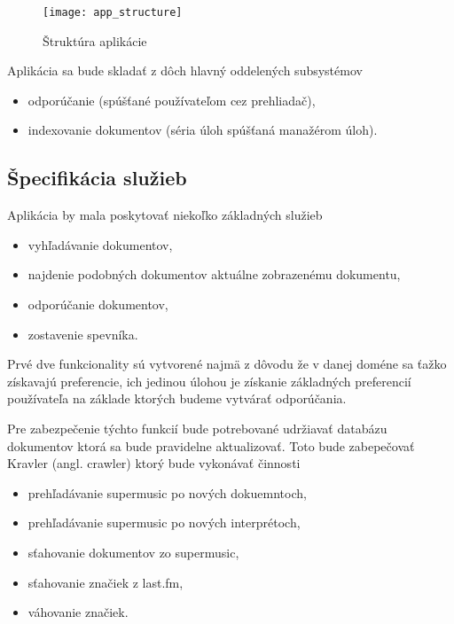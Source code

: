 \begin{figure}
    \begin{center}
        \texttt{[image: app\_structure]}
        \caption{Štruktúra aplikácie}
        \label{fig:app_structure}
    \end{center}
\end{figure}

Aplikácia sa bude skladať z dôch hlavný oddelených subsystémov

\begin{itemize}
\item{odporúčanie (spúšťané používateľom cez prehliadač),}
\item{indexovanie dokumentov (séria úloh spúšťaná manažérom úloh).}
\end{itemize}

\subsection{Špecifikácia služieb}

Aplikácia by mala poskytovať niekoľko základných služieb

\begin{itemize}
\item{vyhľadávanie dokumentov,}
\item{najdenie podobných dokumentov aktuálne zobrazenému dokumentu,}
\item{odporúčanie dokumentov,}
\item{zostavenie spevníka.}
\end{itemize}

Prvé dve funkcionality sú vytvorené najmä z dôvodu že v danej doméne 
sa ťažko získavajú preferencie, ich jedinou úlohou je získanie základných
preferencií používateľa na základe ktorých budeme vytvárať odporúčania.

Pre zabezpečenie týchto funkcií bude potrebované udržiavať databázu dokumentov
ktorá sa bude pravidelne aktualizovať. Toto bude zabepečovať Kravler (angl. crawler)
ktorý bude vykonávať činnosti

\begin{itemize}
\item{prehľadávanie supermusic po nových dokuemntoch,}
\item{prehľadávanie supermusic po nových interprétoch,}
\item{sťahovanie dokumentov zo supermusic,}
\item{sťahovanie značiek z last.fm,}
\item{váhovanie značiek.}
\end{itemize}

